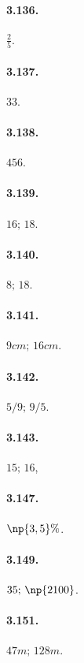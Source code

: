 \begin{multicols}{3}
\paragraph{3.136.}$\frac{2}{5}$.

\paragraph{3.137.}$33$.

\paragraph{3.138.}$456$.

\paragraph{3.139.}$ 16;\, 18 $.

\paragraph{3.140.}$ 8;\, 18 $.

\paragraph{3.141.}$ 9\unit{cm};\, 16\unit{cm} $.

\paragraph{3.142.}$ 5/9;\, 9/5 $.

\paragraph{3.143.}$ 15;\, 16 $,

\paragraph{3.147.}$ \np{3,5}\% $.

\paragraph{3.149.}$ 35;\, \np{2100} $.

\paragraph{3.151.}$ 47\unit{m};\, 128\unit{m} $.


\end{multicols}
